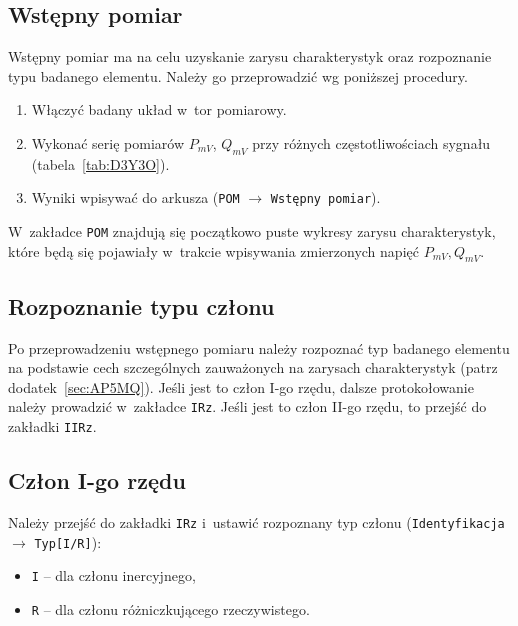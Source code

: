 \documentclass[paper=a4,DIV=12]{lpas}
\begin{document}
\subsection{Wstępny pomiar}
\label{sec:NU1XH}

Wstępny pomiar ma na celu uzyskanie zarysu charakterystyk oraz rozpoznanie typu
badanego elementu. Należy go przeprowadzić wg poniższej procedury.
\begin{enumerate}
  \item Włączyć badany układ w~tor pomiarowy.
  \item Wykonać serię pomiarów $P_{mV}$, $Q_{mV}$ przy różnych
    częstotliwościach sygnału (tabela~\ref{tab:D3Y3O}).
  \item Wyniki wpisywać do arkusza (\texttt{POM} $\rightarrow$ \texttt{Wstępny pomiar}).
\end{enumerate}
W~zakładce \texttt{POM} znajdują się początkowo puste wykresy zarysu
charakterystyk, które będą się pojawiały w~trakcie wpisywania zmierzonych
napięć $P_{mV}, Q_{mV}$.

\subsection{Rozpoznanie typu członu}
\label{sec:NVX7M}

Po przeprowadzeniu wstępnego pomiaru należy rozpoznać typ badanego elementu na
podstawie cech szczególnych zauważonych na zarysach charakterystyk
(patrz dodatek~\ref{sec:AP5MQ}). Jeśli jest to człon I-go rzędu, dalsze
protokołowanie należy prowadzić w~zakładce \texttt{IRz}. Jeśli jest to człon
II-go rzędu, to przejść do zakładki \texttt{IIRz}.

\subsection{Człon I-go rzędu}
\label{sec:3Q2SV}

Należy przejść do zakładki \texttt{IRz} i~ustawić rozpoznany typ członu
(\texttt{Identyfikacja} $\rightarrow$ \texttt{Typ[I/R]}):
\begin{itemize}
  \item \texttt{I} -- dla członu inercyjnego,
  \item \texttt{R} -- dla członu różniczkującego rzeczywistego.
\end{itemize}
\end{document}
